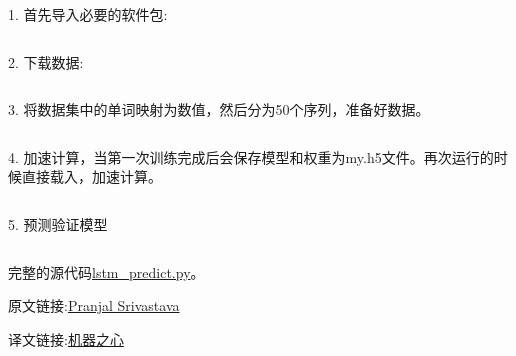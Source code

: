 \documentclass{article}
\begin{document}
1. 首先导入必要的软件包:
\inputminted[firstline=1,firstnumber=1,lastline=7,linenos,breaklines,breakanywhere]{python}{lstm_predict.py}
2. 下载数据:
\inputminted[firstline=8,firstnumber=8,lastline=15,linenos,breaklines,breakanywhere]{python}{lstm_predict.py}
3. 将数据集中的单词映射为数值，然后分为50个序列，准备好数据。
\inputminted[firstline=16,firstnumber=16,lastline=37,linenos,breaklines,breakanywhere]{python}{lstm_predict.py}
4. 加速计算，当第一次训练完成后会保存模型和权重为my.h5文件。再次运行的时候直接载入，加速计算。
\inputminted[firstline=38,firstnumber=38,lastline=51,linenos,breaklines,breakanywhere]{python}{lstm_predict.py}
5. 预测验证模型
\inputminted[firstline=39,firstnumber=39,lastline=65,linenos,breaklines,breakanywhere]{python}{lstm_predict.py}
完整的源代码\href{https://github.com/bleedingfight/tfnote/blob/article/lstm_txt.py}{lstm\_predict.py}。

原文链接:\href{https://www.analyticsvidhya.com/blog/2017/12/fundamentals-of-deep-learning-introduction-to-lstm/}{Pranjal Srivastava}

译文链接:\href{http://mp.weixin.qq.com/s?__biz=MzA3MzI4MjgzMw==&mid=2650734862&idx=1&sn=1a2adda4da7bd7509f10556e8ae218f4&chksm=871ac570b06d4c6644802a4dafe8ab56805ed642dba2e1e4b29ccbaa0d9245c522b7c9a28308&mpshare=1}{机器之心}
\end{document}

